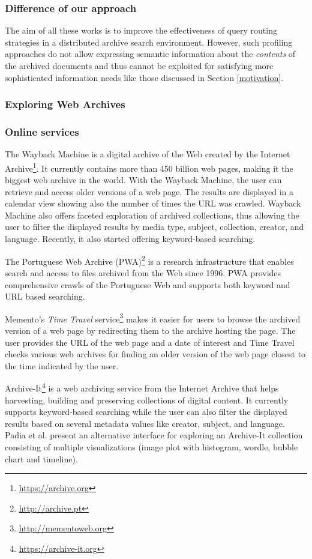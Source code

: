 \documentclass[twocolumn]{svjour3}
\begin{document}
\subsubsection*{Difference of our approach}

The aim of all these works is to improve the effectiveness of
query routing strategies in a distributed archive search environment.
However, such profiling approaches do not allow expressing semantic information about the
{\em contents} of the archived documents and thus cannot be exploited for satisfying more sophisticated
information needs like those discussed in Section \ref{motivation}.


\subsubsection{Exploring Web Archives}

\subsubsection*{Online services}
The Wayback Machine is a digital archive
of the Web
created by the Internet Archive\footnote{\url{https://archive.org}}.
It currently contains more than
450 billion web pages, making it the biggest web archive in the world.
With the Wayback Machine, the user can retrieve and access older versions of a web page.
The results are displayed in a calendar view
showing also the number of times the URL was crawled.
Wayback Machine also offers faceted exploration of archived collections,
thus allowing the user to filter the displayed results by media type, subject,
collection, creator, and language.
Recently, it also started offering keyword-based searching.

The Portuguese Web Archive (PWA)\footnote{\url{http://archive.pt}}
is a research infrastructure that enables search and access to files archived from the Web since 1996.
PWA provides comprehensive crawls of the Portuguese Web
and supports both keyword and URL based searching.

Memento's {\em Time Travel} service\footnote{\url{http://mementoweb.org}}
makes it easier for users
to browse the archived version of a web page
by redirecting them to the archive hosting the page.
The user provides the URL of the web page and a date of interest
and Time Travel checks various web archives for finding
an older version of the web page closest to the time indicated by the user.

Archive-It\footnote{\url{https://archive-it.org}} is a
web archiving service from the Internet Archive that helps
harvesting, building and preserving collections of digital content.
It currently supports keyword-based searching
while the user can also filter the displayed results based on several
metadata values like creator, subject, and language.
Padia et al.\cite{padia2012visualizing} present an alternative interface for
exploring an Archive-It collection
consisting of multiple visualizations (image plot with histogram, wordle,
bubble chart and timeline).
\end{document}
